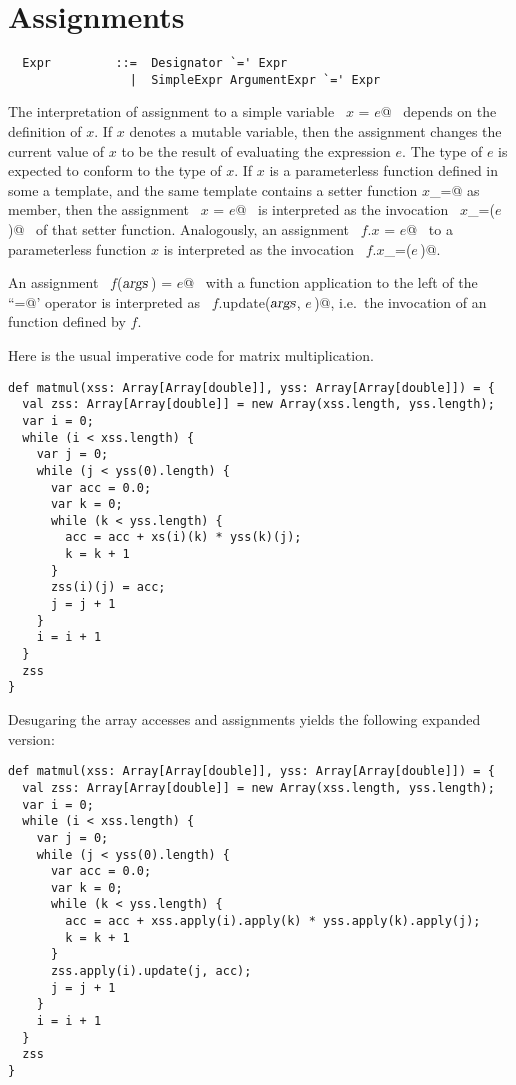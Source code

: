 \documentclass[a4paper,12pt,twoside,titlepage]{book}
\newcommand{\args}{\mbox{\sl args}}
\begin{document}
\section{Assignments}

\syntax\begin{lstlisting}
  Expr         ::=  Designator `=' Expr
                 |  SimpleExpr ArgumentExpr `=' Expr
\end{lstlisting}

The interpretation of assignment to a simple variable ~\lstinline@$x$
= $e$@~ depends on the definition of $x$. If $x$ denotes a mutable
variable, then the assignment changes the current value of $x$ to be
the result of evaluating the expression $e$. The type of $e$ is
expected to conform to the type of $x$. If $x$ is a parameterless
function defined in some a template, and the same template contains a
setter function \lstinline@$x$_=@ as member, then the assignment
~\lstinline@$x$ = $e$@~ is interpreted as the invocation
~\lstinline@$x$_=($e\,$)@~ of that setter function.  Analogously, an
assignment ~\lstinline@$f$.$x$ = $e$@~ to a parameterless function $x$
is interpreted as the invocation ~\lstinline@$f$.$x$_=($e\,$)@.

An assignment ~\lstinline@$f$($\args\,$) = $e$@~ with a function application to the
left of the ``\lstinline@=@' operator is interpreted as 
~\lstinline@$f$.update($\args$, $e\,$)@, i.e.\
the invocation of an  function defined by $f$.

\example \label{ex:imp-mat-mul}
Here is the usual imperative code for matrix multiplication.

\begin{lstlisting}
def matmul(xss: Array[Array[double]], yss: Array[Array[double]]) = {
  val zss: Array[Array[double]] = new Array(xss.length, yss.length);
  var i = 0;
  while (i < xss.length) {
    var j = 0;
    while (j < yss(0).length) {
      var acc = 0.0;
      var k = 0;
      while (k < yss.length) {
        acc = acc + xs(i)(k) * yss(k)(j);
        k = k + 1
      }
      zss(i)(j) = acc;
      j = j + 1
    }
    i = i + 1
  }
  zss
}
\end{lstlisting}
Desugaring the array accesses and assignments yields the following
expanded version:
\begin{lstlisting}
def matmul(xss: Array[Array[double]], yss: Array[Array[double]]) = {
  val zss: Array[Array[double]] = new Array(xss.length, yss.length);
  var i = 0;
  while (i < xss.length) {
    var j = 0;
    while (j < yss(0).length) {
      var acc = 0.0;
      var k = 0;
      while (k < yss.length) {
        acc = acc + xss.apply(i).apply(k) * yss.apply(k).apply(j);
        k = k + 1
      }
      zss.apply(i).update(j, acc);
      j = j + 1
    }
    i = i + 1
  }
  zss
}
\end{lstlisting}
\end{document}
